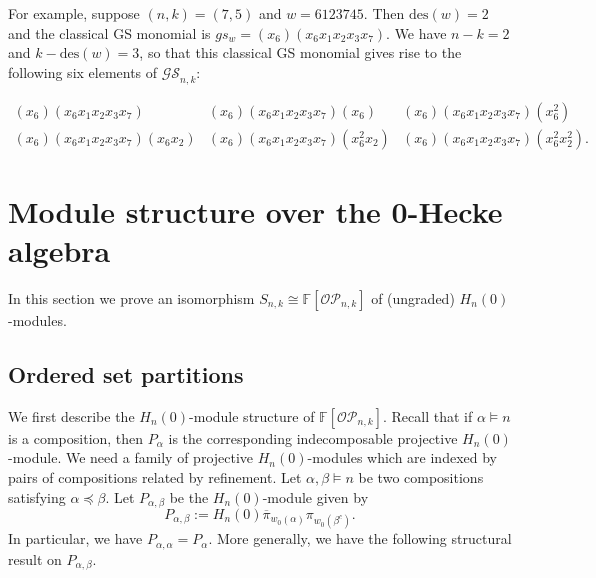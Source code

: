 \documentclass[10pt]{amsart}
\theoremstyle{definition}
\newcommand{\des}{{\mathrm {des}}}
\newcommand{\OP}{{\mathcal{OP}}}
\newcommand{\FF}{{\mathbb{F}}}
\newcommand{\GS}{{\mathcal{GS}}}
\newcommand{\pib}{\overline{\pi}}
\begin{document}
For example, suppose $(n,k) = (7,5)$ and $w = 6123745$.  Then $\des(w) = 2$ and the classical
GS monomial is
$gs_w = (x_6)(x_6 x_1 x_2 x_3 x_7)$.
We have $n-k = 2$ and $k - \des(w) = 3$, so that this classical GS monomial gives rise to the following six elements of
$\GS_{n,k}$:
\begin{center}
$\begin{array}{ccc}
(x_6)(x_6 x_1 x_2 x_3 x_7) & (x_6)(x_6 x_1 x_2 x_3 x_7)(x_6) & (x_6)(x_6 x_1 x_2 x_3 x_7)(x_6^2) \\
(x_6)(x_6 x_1 x_2 x_3 x_7) (x_6 x_2) & (x_6)(x_6 x_1 x_2 x_3 x_7) (x_6^2 x_2) &
(x_6)(x_6 x_1 x_2 x_3 x_7) (x_6^2 x_2^2).
\end{array}$
\end{center}








\section{Module structure over the 0-Hecke algebra}
\label{Module}

In this section we prove  an isomorphism $S_{n,k} \cong \FF[\OP_{n,k}]$ of (ungraded) $H_n(0)$-modules.

\subsection{Ordered set partitions}
\label{osp}
We first describe the $H_n(0)$-module structure of $\FF[\OP_{n,k}]$.
Recall that if $\alpha \models n$ is a composition, then $P_{\alpha}$ is the corresponding 
indecomposable projective $H_n(0)$-module.
We need a family of projective $H_n(0)$-modules which are indexed by pairs of compositions related by refinement.
Let $\alpha, \beta \models n$ be two compositions satisfying $\alpha \preceq \beta$.
Let $P_{\alpha,\beta}$ be the $H_n(0)$-module given by
\begin{equation}\label{P-alpha-beta}
P_{\alpha,\beta} := H_n(0) \pib_{w_0(\alpha)} \pi_{w_0(\beta^c)}.
\end{equation}
In particular, we have $P_{\alpha,\alpha} = P_{\alpha}$.
More generally, we have the following structural result on $P_{\alpha,\beta}$.
\end{document}
